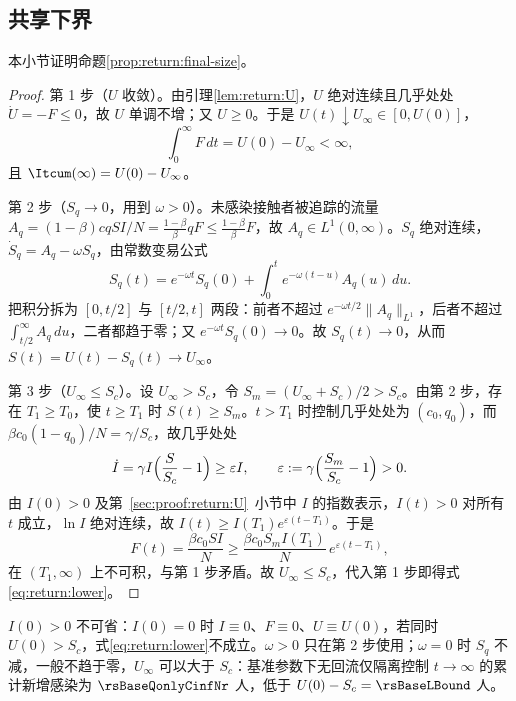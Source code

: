\subsection{共享下界}
\label{sec:proof:return:final-size}
本小节证明命题\ref{prop:return:final-size}。
\begin{proof}
第 1 步（$U$ 收敛）。由引理\ref{lem:return:U}，$U$ 绝对连续且几乎处处 $\dot U=-F\le0$，故 $U$ 单调不增；又 $U\ge0$。于是 $U(t)\downarrow U_\infty\in[0,U(0)]$，
\[
\int_0^\infty F\,dt=U(0)-U_\infty<\infty ,
\]
且 $\Itcum(\infty)=U(0)-U_\infty$。

第 2 步（$S_q\to0$，用到 $\omega>0$）。未感染接触者被追踪的流量 $A_q=(1-\beta)cqSI/N=\frac{1-\beta}{\beta}qF\le\frac{1-\beta}{\beta}F$，故 $A_q\in L^1(0,\infty)$。$S_q$ 绝对连续，$\dot S_q=A_q-\omega S_q$，由常数变易公式
\[
S_q(t)=e^{-\omega t}S_q(0)+\int_0^te^{-\omega(t-u)}A_q(u)\,du .
\]
把积分拆为 $[0,t/2]$ 与 $[t/2,t]$ 两段：前者不超过 $e^{-\omega t/2}\|A_q\|_{L^1}$，后者不超过 $\int_{t/2}^\infty A_q\,du$，二者都趋于零；又 $e^{-\omega t}S_q(0)\to0$。故 $S_q(t)\to0$，从而 $S(t)=U(t)-S_q(t)\to U_\infty$。

第 3 步（$U_\infty\le S_c$）。设 $U_\infty>S_c$，令 $S_m=(U_\infty+S_c)/2>S_c$。由第 2 步，存在 $T_1\ge T_0$，使 $t\ge T_1$ 时 $S(t)\ge S_m$。$t>T_1$ 时控制几乎处处为 $(c_0,q_0)$，而 $\beta c_0(1-q_0)/N=\gamma/S_c$，故几乎处处
\[
\dot I=\gamma I\Bigl(\frac{S}{S_c}-1\Bigr)\ge\varepsilon I,\qquad \varepsilon:=\gamma\Bigl(\frac{S_m}{S_c}-1\Bigr)>0 .
\]
由 $I(0)>0$ 及第~\ref{sec:proof:return:U}~小节中 $I$ 的指数表示，$I(t)>0$ 对所有 $t$ 成立，$\ln I$ 绝对连续，故 $I(t)\ge I(T_1)e^{\varepsilon(t-T_1)}$。于是
\[
F(t)=\frac{\beta c_0SI}{N}\ge\frac{\beta c_0S_mI(T_1)}{N}\,e^{\varepsilon(t-T_1)},
\]
在 $(T_1,\infty)$ 上不可积，与第 1 步矛盾。故 $U_\infty\le S_c$，代入第 1 步即得式\eqref{eq:return:lower}。
\end{proof}
$I(0)>0$ 不可省：$I(0)=0$ 时 $I\equiv0$、$F\equiv0$、$U\equiv U(0)$，若同时 $U(0)>S_c$，式\eqref{eq:return:lower}不成立。$\omega>0$ 只在第 2 步使用；$\omega=0$ 时 $S_q$ 不减，一般不趋于零，$U_\infty$ 可以大于 $S_c$：基准参数下无回流仅隔离控制 $t\to\infty$ 的累计新增感染为 $\rsBaseQonlyCinfNr$ 人，低于 $U(0)-S_c=\rsBaseLBound$ 人。

